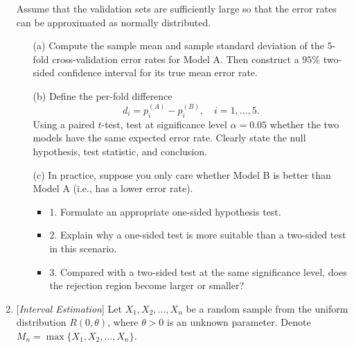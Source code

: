 \documentclass[10pt]{article}
\begin{document}
\begin{enumerate}
Assume that the validation sets are sufficiently large so that the error
rates can be approximated as normally distributed.

\begin{itemize}
\item[(a)]
Compute the sample mean and sample standard deviation of the
$5$-fold cross-validation error rates for Model A.
Then construct a $95\%$ two-sided confidence interval for its
true mean error rate.


\item[(b)]
Define the per-fold difference
\[
d_i = p_i^{(A)} - p_i^{(B)}, \quad i=1,\dots,5.
\]
Using a paired $t$-test, test at significance level $\alpha=0.05$
whether the two models have the same expected error rate.
Clearly state the null hypothesis, test statistic, and conclusion.

\item[(c)]
In practice, suppose you only care whether Model B is better than Model A
(i.e., has a lower error rate).
\begin{itemize}
\item 1. Formulate an appropriate one-sided hypothesis test.
\item 2. Explain why a one-sided test is more suitable than a two-sided test
in this scenario.
\item 3. Compared with a two-sided test at the same significance level,
does the rejection region become larger or smaller?
\end{itemize}
\end{itemize}







\newpage

\item {} [\textit{Interval Estimation}]
Let \( X_1, X_2, \dots, X_n \) be a random sample from the uniform distribution \( R(0, \theta) \), where \( \theta > 0 \) is an unknown parameter. Denote \( M_n = \max\{X_1, X_2, \dots, X_n\} \).


\end{enumerate}
\end{document}
